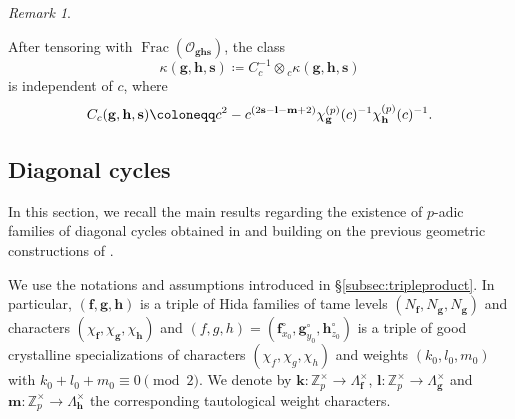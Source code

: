 \documentclass[a4paper,11pt]{amsart}
\theoremstyle{plain}
\theoremstyle{definition}
\theoremstyle{remark}
\newtheorem{remarkwr}[theorem]{Remark}
\newenvironment{remark}{\begin{remarkwr}\begin{upshape}}{\end{upshape}\end{remarkwr}}
\newcommand{\bb}{\mathbb}
\newcommand{\hf}{{\mathbf{f}}}
\newcommand{\hg}{{\mathbf{g}}}
\newcommand{\hh}{{\mathbf h}}
\numberwithin{equation}{section}
\begin{document}

\begin{remark}\label{rk:dependenceofBFonc}
After tensoring with $\operatorname{Frac} (\mathcal{O}_{\mathbf{ghs}})$, the class
\[
\kappa(\hg, \hh,\mathbf{s}) \coloneqq C_c^{-1} \otimes {}_c \kappa(\hg, \hh,\mathbf{s})
\]
is independent of $c$, where
\begin{equation}
 \label{eq:defCd}
  C_c(\hg,\hh,{\bf s}) \coloneqq c^2 - c^{(2{\bf s}-{\bf l}-{\bf m}+2)}\chi_\hg^{(p)}(c)^{-1} \chi_\hh^{(p)}(c)^{-1}.
\end{equation}
\end{remark}




\subsection{Diagonal cycles}\label{subsec:diagonalcycles}

In this section, we recall the main results regarding the existence of $p$-adic families of diagonal cycles obtained in \cite{DR3} and \cite{BSV2} building on the previous geometric constructions of \cite{DR2}.

We use the notations and assumptions introduced in \S\ref{subsec:tripleproduct}. In particular, $(\hf,\hg,\hh)$ is a triple of Hida families of tame levels $(N_\hf,N_\hg,N_\hg)$ and characters $(\chi_\hf,\chi_\hg,\chi_\hh)$ and $(f,g,h)=(\hf_{x_0}^\circ,\hg_{y_0}^\circ,\hh_{z_0}^\circ)$ is a triple of good crystalline specializations of characters $(\chi_f,\chi_g,\chi_h)$ and weights $(k_0,l_0,m_0)$ with $k_{0}+l_{0}+m_{0}\equiv 0\pmod{2}$. %
We denote by $\mathbf{k}:\bb{Z}_p^\times \rightarrow \Lambda_\hf^\times$, $\mathbf{l}:\bb{Z}_p^\times\rightarrow \Lambda_\hg^\times$ and $\mathbf{m}:\bb{Z}_p^\times \rightarrow \Lambda_\hh^\times$ the corresponding tautological weight characters.
\end{document}

